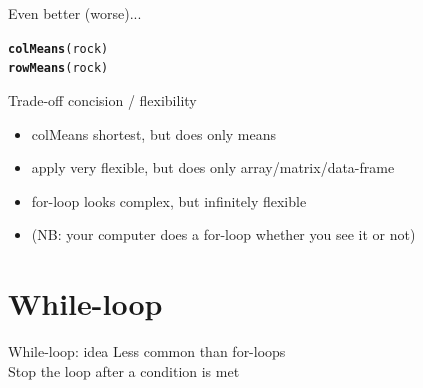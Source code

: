 \documentclass[10pt]{beamer}\usepackage[]{graphicx}\usepackage[]{color}
\makeatletter
\newcommand{\hlstd}[1]{\textcolor[rgb]{0.345,0.345,0.345}{#1}}%
\newcommand{\hlkwd}[1]{\textcolor[rgb]{0.737,0.353,0.396}{\textbf{#1}}}%
\newenvironment{kframe}{%
 \def\at@end@of@kframe{}%
 \ifinner\ifhmode%
  \def\at@end@of@kframe{\end{minipage}}%
  \begin{minipage}{\columnwidth}%
 \fi\fi%
 \def\FrameCommand##1{\hskip\@totalleftmargin \hskip-\fboxsep
 \colorbox{shadecolor}{##1}\hskip-\fboxsep
     \hskip-\linewidth \hskip-\@totalleftmargin \hskip\columnwidth}%
 \MakeFramed {\advance\hsize-\width
   \@totalleftmargin\z@ \linewidth\hsize
   \@setminipage}}%
 {\par\unskip\endMakeFramed%
 \at@end@of@kframe}
\newenvironment{knitrout}{}{} %
\makeatother
\begin{document}
\begin{frame}[fragile]{Even better (worse)...}

\begin{knitrout}
\color{fgcolor}\begin{kframe}
\begin{alltt}
  \hlkwd{colMeans}\hlstd{(rock)}
  \hlkwd{rowMeans}\hlstd{(rock)}
\end{alltt}
\end{kframe}
\end{knitrout}

  \pause

  \begin{alertblock}{Trade-off concision  / flexibility}
    \begin{itemize}
      \item colMeans shortest, but does only means
      \item apply very flexible, but does only array/matrix/data-frame
      \item for-loop looks complex, but infinitely flexible
      \item (NB: your computer does a for-loop whether you see it or not)
    \end{itemize}
  \end{alertblock}

\end{frame}

\section{While-loop}

\begin{frame}[fragile]{While-loop: idea}
Less common than for-loops\\
Stop the loop after a condition is met\\


  
\end{frame}
\end{document}
